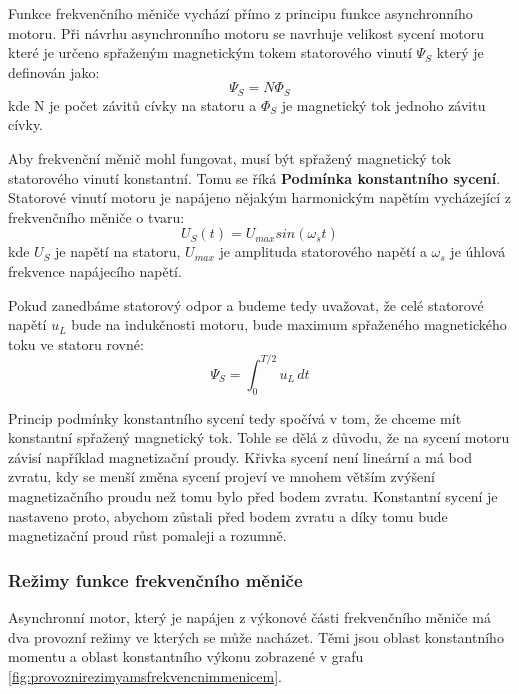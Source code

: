 Funkce frekvenčního měniče vychází přímo z principu funkce asynchronního motoru. Při návrhu asynchronního motoru se navrhuje velikost sycení motoru které je určeno spřaženým magnetickým tokem statorového vinutí $\Psi_S$ který je definován jako:
\begin{equation}
	\Psi_S = N\Phi_S
	\label{eq:SdruzenyMagnetickyTok}
\end{equation}
kde N je počet závitů cívky na statoru a $\Phi_S$ je magnetický tok jednoho závitu cívky.

Aby frekvenční měnič mohl fungovat, musí být spřažený magnetický tok statorového vinutí konstantní. Tomu se říká \textbf{Podmínka konstantního sycení}. Statorové vinutí motoru je napájeno nějakým harmonickým napětím vycházející z frekvenčního měniče o tvaru:
\begin{equation}
	U_S(t) = U_{max}sin(\omega_st)
	\label{eq:NapetiNaStatoru}
\end{equation}
kde $U_S$ je napětí na statoru, $U_{max}$ je amplituda statorového napětí a $\omega_s$ je úhlová frekvence napájecího napětí.
\cite{SkriptaRizeniOtacekAM}

Pokud zanedbáme statorový odpor a budeme tedy uvažovat, že celé statorové napětí $u_L$ bude na indukčnosti motoru, bude maximum spřaženého magnetického toku ve statoru rovné: \cite{SkriptaRizeniOtacekAM}
\begin{equation}
	\Psi_S = \int_0^{T/2} u_L \, dt
	\label{eq:PodminkaKonstantnihoSyceni}
\end{equation}


Princip podmínky konstantního sycení tedy spočívá v tom, že chceme mít konstantní spřažený magnetický tok. Tohle se dělá z důvodu, že na sycení motoru závisí například magnetizační proudy. Křivka sycení není lineární a má bod zvratu, kdy se menší změna sycení projeví ve mnohem větším zvýšení magnetizačního proudu než tomu bylo před bodem zvratu. Konstantní sycení je nastaveno proto, abychom zůstali před bodem zvratu a díky tomu bude magnetizační proud růst pomaleji a rozumně.

\subsubsection{Režimy funkce frekvenčního měniče}
Asynchronní motor, který je napájen z výkonové části frekvenčního měniče má dva provozní režimy ve kterých se může nacházet. Těmi jsou oblast konstantního momentu a oblast konstantního výkonu zobrazené v grafu \ref{fig:provoznirezimyamsfrekvencnimmenicem}.

